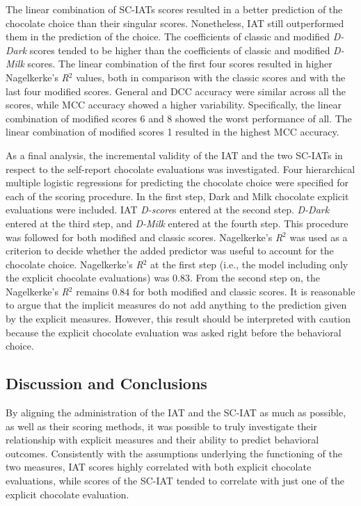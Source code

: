 \documentclass[12pt]{book}
\begin{document}
The linear combination of SC-IATs scores resulted in a better prediction of the chocolate choice than their singular scores. Nonetheless, IAT still outperformed them in the prediction of the choice. The coefficients of classic and modified \emph{D-Dark} scores tended to be higher than the coefficients of classic and modified \emph{D-Milk} scores. The linear combination of the first four scores resulted in higher Nagelkerke's \emph{R}$^2$ values, both in comparison with the classic scores and with the last four modified scores. General and DCC accuracy were similar across all the scores, while MCC accuracy showed a higher variability. Specifically, the linear combination of modified scores 6 and 8 showed the worst performance of all. The linear combination of modified scores 1 resulted in the highest MCC accuracy. 

As a final analysis, the incremental validity of the IAT and the two SC-IATs in respect to the self-report chocolate evaluations was investigated. Four hierarchical multiple logistic regressions for predicting the chocolate choice were specified for each of the scoring procedure. In the first step, Dark and Milk chocolate explicit evaluations were included. IAT \emph{D-score}s entered at the second step. \emph{D-Dark} entered at the third step, and \emph{D-Milk} entered at the fourth step. This procedure was followed for both modified and classic scores. Nagelkerke’s \emph{R}$^2$ was used as a criterion to decide whether the added predictor was useful to account for the chocolate choice. Nagelkerke’s \emph{R}$^2$ at the first step (i.e., the model including only the explicit chocolate evaluations) was 0.83. From the second step on, the Nagelkerke’s \emph{R}$^2$ remains $0.84$ for both modified and classic scores. It is reasonable to argue that the implicit measures do not add anything to the prediction given by the explicit measures. However, this result should be interpreted with caution because the explicit chocolate evaluation was asked right before the behavioral choice.

\subsection{Discussion and Conclusions}
By aligning the administration of the IAT and the SC-IAT as much as possible, as well as their scoring methods, it was possible to truly investigate their relationship with explicit measures and their ability to predict behavioral outcomes.
Consistently with the assumptions underlying the functioning of the two measures, IAT scores highly correlated with both explicit chocolate evaluations, while scores of the SC-IAT tended to correlate with just one of the explicit chocolate evaluation.
\end{document}
